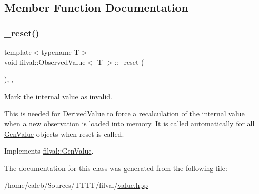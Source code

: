 \subsection{Member Function Documentation}
\hypertarget{classfilval_1_1ObservedValue_a68c4fc1eb89682c7b16d2d46874f5421}{}\label{classfilval_1_1ObservedValue_a68c4fc1eb89682c7b16d2d46874f5421} 
\subsubsection{\texorpdfstring{\+\_\+reset()}{\_reset()}}
{\footnotesize\ttfamily template$<$typename T$>$ \\
void \hyperlink{classfilval_1_1ObservedValue}{filval\+::\+Observed\+Value}$<$ T $>$\+::\+\_\+reset (\begin{DoxyParamCaption}{ }\end{DoxyParamCaption})\hspace{0.3cm}{\ttfamily [inline]}, {\ttfamily [private]}, {\ttfamily [virtual]}}



Mark the internal value as invalid. 

This is needed for \hyperlink{classfilval_1_1DerivedValue}{Derived\+Value} to force a recalculation of the internal value when a new observation is loaded into memory. It is called automatically for all \hyperlink{classfilval_1_1GenValue}{Gen\+Value} objects when reset is called. 

Implements \hyperlink{classfilval_1_1GenValue_ae9d5bd9fde2d04f6cd05d5b901a8c78a}{filval\+::\+Gen\+Value}.



The documentation for this class was generated from the following file\+:\begin{DoxyCompactItemize}
\item 
/home/caleb/\+Sources/\+T\+T\+T\+T/filval/\hyperlink{value_8hpp}{value.\+hpp}\end{DoxyCompactItemize}
